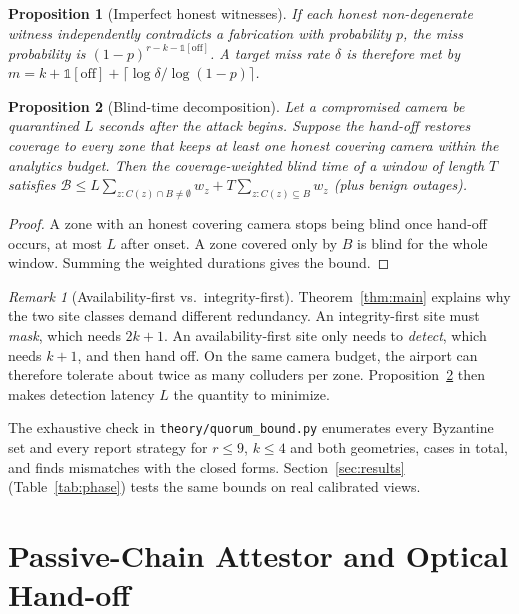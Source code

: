 \documentclass[journal]{IEEEtran}
\newtheorem{proposition}{Proposition}
\theoremstyle{remark}
\newtheorem{remark}{Remark}
\begin{document}
\begin{proposition}[Imperfect honest witnesses]\label{prop:prob}
If each honest non-degenerate witness independently contradicts a fabrication with probability $p$, the miss
probability is $(1-p)^{r-k-\mathbb{1}[\text{off}]}$. A target miss rate $\delta$ is therefore met by
$m=k+\mathbb{1}[\text{off}]+\lceil\log\delta/\log(1-p)\rceil$.
\end{proposition}

\begin{proposition}[Blind-time decomposition]\label{prop:blind}
Let a compromised camera be quarantined $L$ seconds after the attack begins. Suppose the hand-off restores coverage to
every zone that keeps at least one honest covering camera within the analytics budget. Then the coverage-weighted
blind time of a window of length $T$ satisfies
$\mathcal{B}\le L\sum_{z:C(z)\cap B\neq\emptyset} w_z + T\sum_{z:C(z)\subseteq B} w_z$ (plus benign outages).
\end{proposition}
\begin{proof}
A zone with an honest covering camera stops being blind once hand-off occurs, at most $L$ after onset. A zone covered
only by $B$ is blind for the whole window. Summing the weighted durations gives the bound.
\end{proof}

\begin{remark}[Availability-first vs.\ integrity-first]
Theorem~\ref{thm:main} explains why the two site classes demand different redundancy. An integrity-first site must
\emph{mask}, which needs $2k{+}1$. An availability-first site only needs to \emph{detect}, which needs $k{+}1$, and then
hand off. On the same camera budget, the airport can therefore tolerate about twice as many colluders per zone.
Proposition~\ref{prop:blind} then makes detection latency $L$ the quantity to minimize.
\end{remark}

The exhaustive check in \texttt{theory/quorum\_bound.py} enumerates every Byzantine set and every report strategy for
$r\le 9$, $k\le 4$ and both geometries, \TheoryCases{} cases in total, and finds \TheoryMismatch{} mismatches with the
closed forms. Section~\ref{sec:results} (Table~\ref{tab:phase}) tests the same bounds on real calibrated views.

\section{Passive-Chain Attestor and Optical Hand-off}\label{sec:method}
\end{document}
